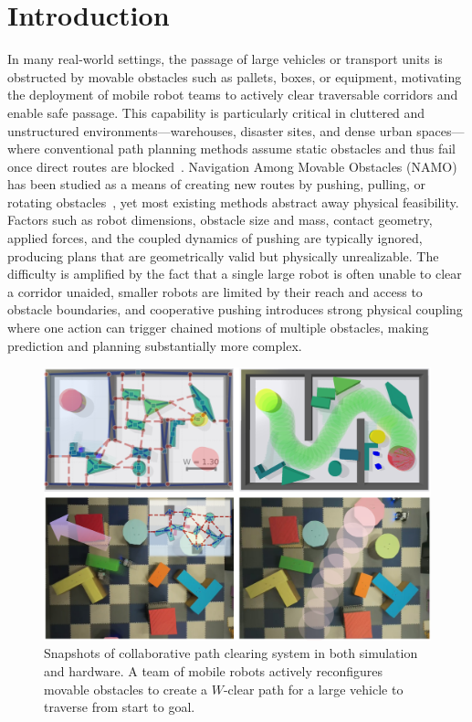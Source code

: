 \section{Introduction}\label{sec:intro}
In many real-world settings, the passage of large vehicles or transport units is
obstructed by movable obstacles such as pallets, boxes, or equipment, motivating
the deployment of mobile robot teams to actively clear traversable corridors and
enable safe passage. This capability is particularly critical in cluttered and
unstructured environments—warehouses, disaster sites, and dense urban spaces—
where conventional path planning methods assume static obstacles and thus fail
once direct routes are blocked~\cite{liu2023path}. Navigation Among Movable
Obstacles (NAMO) has been studied as a means of creating new routes by pushing,
pulling, or rotating obstacles~\cite{stilman2005navigation}, yet most existing
methods abstract away physical feasibility. Factors such as robot dimensions,
obstacle size and mass, contact geometry, applied forces, and the coupled
dynamics of pushing are typically ignored, producing plans that are geometrically
valid but physically unrealizable. The difficulty is amplified by the fact that
a single large robot is often unable to clear a corridor unaided, smaller robots
are limited by their reach and access to obstacle boundaries, and cooperative
pushing introduces strong physical coupling where one action can trigger chained
motions of multiple obstacles, making prediction and planning substantially more
complex.

\begin{figure}[t!]
  \centering
  \vspace{1mm}
  \includegraphics[width=\linewidth]{figures/cover.png}%
  \caption{
  Snapshots of collaborative path clearing system in both simulation and
  hardware. A team of mobile robots actively reconfigures movable
  obstacles to create a $W$-clear path for a large vehicle
  to traverse from start to goal.
  }
  \label{fig:snapshots}
\end{figure}

